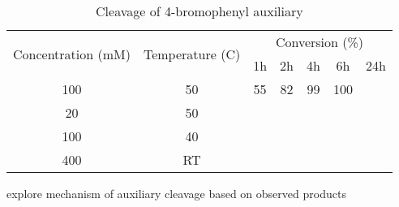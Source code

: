\begin{table}[h]
\centering
\begin{tabular}{@{}ccccccc@{}}
\toprule
\multirow{2}{*}{Concentration (mM)} & \multirow{2}{*}{Temperature (C)} & \multicolumn{5}{c}{Conversion (\%)} \\ \cmidrule(l){3-7}
                                    &                                  & 1h    & 2h   & 4h   & 6h    & 24h   \\ \cmidrule(r){1-2}
100                                 & 50                               & 55    & 82   & 99   & 100   &       \\
20                                  & 50                               &       &      &      &       &       \\
100                                 & 40                               &       &      &      &       &       \\
400                                 & RT                               &       &      &      &       &       \\ \bottomrule
\end{tabular}
\caption{Cleavage of 4-bromophenyl auxiliary}
\label{bromoauxiliarycleavagedata}
\end{table}

    explore mechanism of auxiliary cleavage based on observed products



